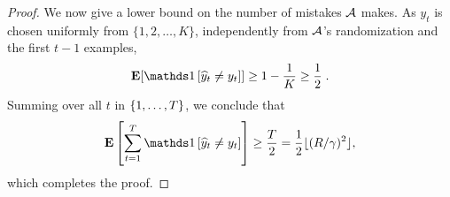 \begin{proof}
We now give a lower bound on the number of mistakes $\mathcal{A}$ makes.
As $y_t$ is chosen uniformly from $\{1,2,\dots,K\}$, independently from
$\mathcal{A}$'s randomization and the first $t-1$ examples,
$$
\Exp[ \indicator{\widehat y_t \neq y_t} ] \ge 1 - \frac{1}{K} \ge \frac{1}{2} \; .
$$
Summing over all $t$ in $\cbr{1,\ldots,T}$, we conclude that
$$
\Exp \sbr{ \sum_{t=1}^T \indicator{\widehat y_t \neq y_t} } \geq \frac T 2 = \frac 1 2 \lfloor (R/\gamma)^2 \rfloor,
$$
which completes the proof.
\end{proof}

